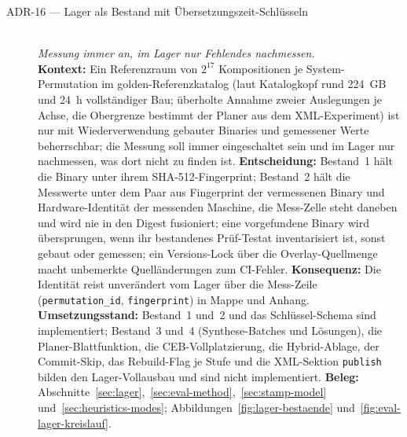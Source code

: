 \begin{description}
  \item[ADR-16 --- Lager als Bestand mit Übersetzungszeit-Schlüsseln]\hfill\\
  \emph{Messung immer an, im Lager nur Fehlendes nachmessen.}\hfill\\
  \textbf{Kontext:} Ein Referenzraum von $2^{17}$ Kompositionen je System-Permutation im golden-Referenzkatalog (laut
  Katalogkopf rund 224~GB und 24~h vollständiger Bau; überholte Annahme zweier Auslegungen je Achse, die
  Obergrenze bestimmt der Planer aus dem XML-Experiment) ist nur mit Wiederverwendung gebauter Binaries und
  gemessener Werte beherrschbar; die Messung soll immer eingeschaltet sein und im Lager nur
  nachmessen, was dort nicht zu finden ist.
  \textbf{Entscheidung:} Bestand~1 hält die Binary unter ihrem SHA-512-Fingerprint; Bestand~2 hält
  die Messwerte unter dem Paar aus Fingerprint der vermessenen Binary und Hardware-Identität der
  messenden Maschine, die Mess-Zelle steht daneben und wird nie in den Digest fusioniert; eine
  vorgefundene Binary wird übersprungen, wenn ihr bestandenes Prüf-Testat inventarisiert ist, sonst gebaut
  oder gemessen; ein Versions-Lock über die Overlay-Quellmenge macht unbemerkte Quelländerungen zum
  CI-Fehler.
  \textbf{Konsequenz:} Die Identität reist unverändert vom Lager über die Mess-Zeile
  (\texttt{permutation\_id}, \texttt{fingerprint}) in Mappe und Anhang.
  \textbf{Umsetzungsstand:} Bestand~1 und~2 und das Schlüssel-Schema sind implementiert; Bestand~3 und~4
  (Synthese-Batches und Lösungen), die Planer-Blattfunktion, die CEB-Vollplatzierung, die
  Hybrid-Ablage, der Commit-Skip, das Rebuild-Flag je Stufe und die XML-Sektion \texttt{publish} bilden
  den Lager-Vollausbau und sind nicht implementiert.
  \textbf{Beleg:} Abschnitte~\ref{sec:lager},~\ref{sec:eval-method},~\ref{sec:stamp-model}
  und~\ref{sec:heuristics-modes}; Abbildungen~\ref{fig:lager-bestaende}
  und~\ref{fig:eval-lager-kreislauf}.


\end{description}
